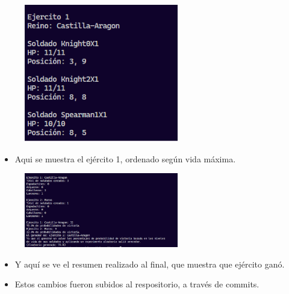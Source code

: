 \documentclass{article}
\begin{document}
	\begin{figure}[H]
		\centering
	\includegraphics[width=0.6\textwidth,keepaspectratio]{img/ordenar.png}
	\end{figure}
	\begin{itemize}	
		\item Aqui se muestra el ejército 1, ordenado según vida máxima.
	\end{itemize}
	\begin{figure}[H]
		\centering
	\includegraphics[width=0.6\textwidth,keepaspectratio]{img/resumen.png}
	\end{figure}
	\begin{itemize}	
		\item Y aquí se ve el resumen realizado al final, que muestra que ejército ganó.
		\item Estos cambios fueron subidos al respositorio, a través de commits.
	\end{itemize}
	
\end{document}

